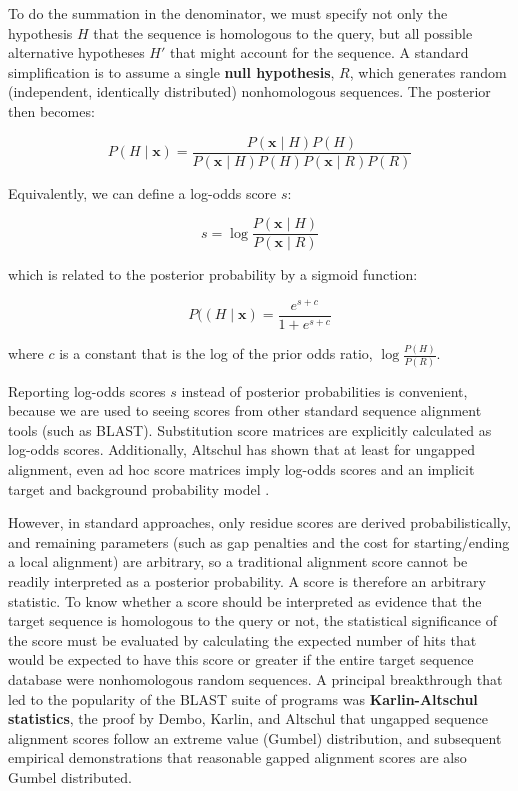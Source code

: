 \documentclass[11pt]{article}
\begin{document}
To do the summation in the denominator, we must specify not only the
hypothesis $H$ that the sequence is homologous to the query, but all
possible alternative hypotheses $H'$ that might account for the
sequence. A standard simplification is to assume a single \textbf{null
hypothesis}, $R$, which generates random (independent, identically
distributed) nonhomologous sequences. The posterior then becomes:

\begin{equation}
   P(H \mid \mathbf{x}) = \frac{P(\mathbf{x} \mid H) P(H)}
                           {P(\mathbf{x} \mid H) P(H) P(\mathbf{x} \mid R) P(R)}
\end{equation}

Equivalently, we can define a log-odds score $s$:

\begin{equation}
  s = \log \frac{P(\mathbf{x} \mid H)} {P(\mathbf{x} \mid R)}
\end{equation}
 
which is related to the posterior probability by a sigmoid function:

\begin{equation}
  P((H \mid \mathbf{x}) = \frac{e^{s+c}} {1 + e^{s+c}}
\end{equation}

where $c$ is a constant that is the log of the prior odds ratio, $\log
\frac{P(H)}{P(R)}$.

Reporting log-odds scores $s$ instead of posterior probabilities is
convenient, because we are used to seeing scores from other standard
sequence alignment tools (such as BLAST). Substitution score matrices
are explicitly calculated as log-odds scores.  Additionally, Altschul
has shown that at least for ungapped alignment, even ad hoc score
matrices imply log-odds scores and an implicit target and background
probability model \citep{Altschul91}.

However, in standard approaches, only residue scores are derived
probabilistically, and remaining parameters (such as gap penalties and
the cost for starting/ending a local alignment) are arbitrary, so a
traditional alignment score cannot be readily interpreted as a
posterior probability. A score is therefore an arbitrary statistic.
To know whether a score should be interpreted as evidence that the
target sequence is homologous to the query or not, the statistical
significance of the score must be evaluated by calculating the
expected number of hits that would be expected to have this score or
greater if the entire target sequence database were nonhomologous
random sequences. A principal breakthrough that led to the popularity
of the BLAST suite of programs was \textbf{Karlin-Altschul
statistics}, the proof by Dembo, Karlin, and Altschul that ungapped
sequence alignment scores follow an extreme value (Gumbel)
distribution, and subsequent empirical demonstrations that reasonable
gapped alignment scores are also Gumbel distributed.
\end{document}
